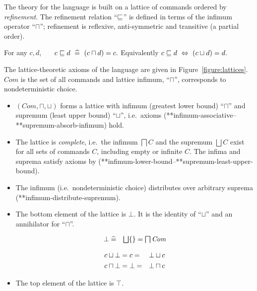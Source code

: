 \documentclass[fleqn]{fac}
\makeatletter
\def\refaxiom{\@ifnextchar*{\@refaxiom}{\@@refaxiom}}
\def\@refaxiom*#1{\ref{axiom-#1}\index{Axiom!#1|LawUse}}
\def\@@refaxiom#1{axiom~(\ref{axiom-#1})\index{Axiom!#1|LawUse}}
\newcommand{\labelproperty}[1]{\label{property-#1}\index{Property!#1|PropertyDef{\ref{property-#1}}}}
\newcommand{\labeldefinition}[1]{\label{def-#1}\index{Definition!#1|DefinitionDef{\ref{def-#1}}}}
\newcommand{\sdefs}{\mathrel{\widehat=}}\newcommand{\spot}{\mathrel{{\cdot}}}\newcommand{\where}{\mathrel{|}}\renewcommand{\implies}{\mathrel{\Rightarrow}}\newcommand{\emptyrel}{\emptyset}
\renewcommand{\iff}{\mathrel{\Leftrightarrow}}
\newcommand{\Command}{\mathit{Com}}
\newcommand{\nondet}{\mathbin{\sqcap}}
\newcommand{\Nondet}{\mathop{\textstyle\bigsqcap}}
\newcommand{\angelic}{\mathbin{\sqcup}}
\newcommand{\Angelic}{\mathop{\textstyle\bigsqcup}}
\newcommand{\ifinv}[2]{#2}
\newcommand{\Keyword}[1]{\mathsf{\mathbf{#1}}}
\newcommand{\Magic}{\Keyword{\top}}
\newcommand{\Abort}{\Keyword{\bot}}
\makeatother
\begin{document}
The theory for the language is built on a lattice of commands ordered by \emph{refinement}. 
The refinement relation ``$\mathrel{\sqsubseteq}$'' is defined in terms of the infimum operator ``$\nondet$'';
refinement is reflexive, anti-symmetric and transitive (a partial order).
\begin{definitionx}[refinement]
For any $c,d$,~~~
\(
  c \refsto d ~\sdefs~ (c \nondet d) = c.
\)
Equivalently $c \refsto d ~\iff~  (c \angelic d) = d$.
\end{definitionx}
The lattice-theoretic axioms of the language are given in Figure~\ref{figure:lattices}.
$\Command$ is the set of all commands and lattice infimum, ``$\nondet$'', corresponds to nondeterministic choice.
\begin{itemize}
\item
$(\Command, \nondet, \angelic)$ forms a lattice with infimum (greatest lower bound) ``$\nondet$'' and 
supremum (least upper bound) ``$\angelic$'',
i.e.\ axioms
(\refaxiom*{infimum-associative}--\refaxiom*{supremum-absorb-infimum}) hold.
\item
The lattice is \emph{complete},
i.e.\ the infimum $\Nondet C$ and the supremum $\Angelic C$ exist for all sets of commands $C$,
including empty or infinite $C$.
The infima and suprema satisfy axioms 
by (\refaxiom*{infimum-lower-bound}--\refaxiom*{supremum-least-upper-bound}).
\item
The infimum (i.e.\ nondeterministic choice) distributes over arbitrary suprema (\refaxiom*{infimum-distribute-supremum}).
\item
The \ifinv{top}{bottom} element of the lattice is $\Abort$.
It is the identity of ``$\angelic$'' and an annihilator for ``$\nondet$''. \\[-1ex]
\begin{minipage}{0.48\textwidth}
\begin{eqnarray}
  \Abort & \sdefs & \Angelic \{\} = \Nondet \Command \labeldefinition{bottom} 
\end{eqnarray}
\end{minipage}
\begin{minipage}{0.48\textwidth}
\begin{eqnarray}
  c \angelic \Abort & =  c  = & \Abort \angelic c  \labelproperty{supremum-identity} \\
  c \nondet \Abort & = \Abort  = & \Abort \nondet c  \labelproperty{nondet-abort-zero}
\end{eqnarray}
\end{minipage}
\item
The \ifinv{bottom}{top} element of the lattice is $\Magic$.

\end{itemize}
\end{document}
